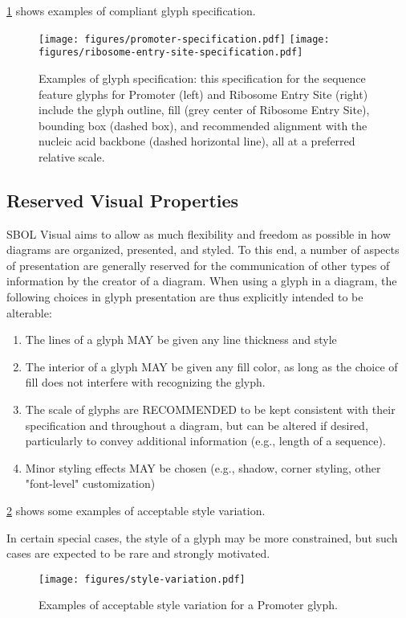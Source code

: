 \ref{f:specexample} shows examples of compliant glyph specification.

\begin{figure}[h!]
\centering
\texttt{[image: figures/promoter-specification.pdf]}
\texttt{[image: figures/ribosome-entry-site-specification.pdf]}
\caption{Examples of glyph specification: this specification for the sequence feature glyphs for Promoter (left) and Ribosome Entry Site (right) include the glyph outline, fill (grey center of Ribosome Entry Site), bounding box (dashed box), and recommended alignment with the nucleic acid backbone (dashed horizontal line), all at a preferred relative scale.}
\label{f:specexample}
\end{figure}

\subsection{Reserved Visual Properties}

SBOL Visual aims to allow as much flexibility and freedom as possible in how diagrams are organized, presented, and styled.
%
To this end, a number of aspects of presentation are generally reserved for the communication of other types of information by the creator of a diagram.
%
When using a glyph in a diagram, the following choices in glyph presentation are thus explicitly intended to be alterable:
\begin{enumerate}
\item The lines of a glyph MAY be given any line thickness and style
\item The interior of a glyph MAY be given any fill color, as long as the choice of fill does not interfere with recognizing the glyph.
\item The scale of glyphs are RECOMMENDED to be kept consistent with their specification and throughout a diagram, but can be altered if desired, particularly to convey additional information (e.g., length of a sequence).
\item Minor styling effects MAY be chosen (e.g., shadow, corner styling, other "font-level" customization)
\end{enumerate}
\ref{f:stylevariation} shows some examples of acceptable style variation.

In certain special cases, the style of a glyph may be more constrained, but such cases are expected to be rare and strongly motivated.

\begin{figure}[h!]
\centering
\texttt{[image: figures/style-variation.pdf]}
\caption{Examples of acceptable style variation for a Promoter glyph.}
\label{f:stylevariation}
\end{figure}

